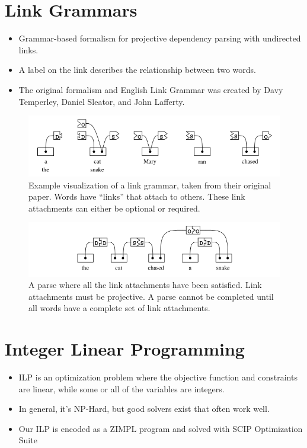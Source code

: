\documentclass[a0,landscape]{a0poster}
\begin{document}
\begin{multicols}{4}
\section*{Link Grammars}
\begin{itemize}
\item Grammar-based formalism for projective dependency parsing with undirected links. 
\item A label on the link describes the relationship between two words.
\item The original formalism and English Link Grammar was created by Davy Temperley, Daniel Sleator, and John Lafferty\cite{sleator-temperley-1991}.
\end{itemize}
\begin{figure}[H]
\centering
\includegraphics{linkgrammar_example1.png}
\caption*{Example visualization of a link grammar, taken from their original paper. Words have ``links'' that attach to others. These link attachments can either be optional or required.}
\end{figure}
\begin{figure}[H]
\centering
\includegraphics{linkgrammar_example2.png}
\caption*{A parse where all the link attachments have been satisfied. Link attachments must be projective. A parse cannot be completed until all words have a complete set of link attachments.}
\end{figure}

\section*{Integer Linear Programming}
\begin{itemize}
\item ILP is an optimization problem where the objective function and constraints are linear, while some or all of the variables are integers. 
\item In general, it's NP-Hard, but good solvers exist that often work well.
\item Our ILP is encoded as a ZIMPL program and solved with SCIP Optimization Suite\cite{Koch2004, achterberg2009scip}
\end{itemize}



\end{multicols}
\end{document}
